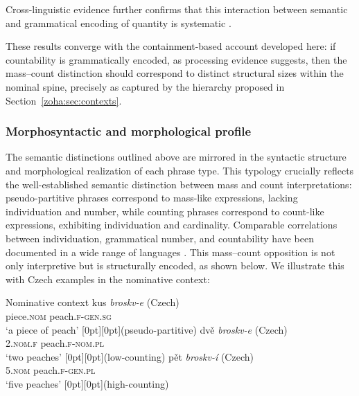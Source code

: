 \documentclass[output=paper,colorlinks,citecolor=brown
]{langscibook}
\begin{document}
Cross-linguistic evidence further confirms that this interaction between semantic and grammatical encoding of quantity is systematic 
\citep{Doetjes2017}.

These results converge with the containment-based account developed here: if countability is grammatically encoded, as processing evidence suggests, then the mass–count distinction should correspond to distinct structural sizes within the nominal spine, precisely as captured by the hierarchy proposed in Section~\ref{zoha:sec:contexts}.

\subsubsection{Morphosyntactic and morphological profile} \label{zoha:sec:types-morph}

The semantic distinctions outlined above are mirrored in the syntactic structure and morphological realization of each phrase type. This typology crucially reflects the well-established semantic distinction between mass and count interpretations: pseudo-partitive phrases correspond to mass-like expressions, lacking individuation and number, while counting phrases correspond to count-like expressions, exhibiting individuation and cardinality. Comparable correlations between individuation, grammatical number, and countability have been documented in a wide range of languages \citep{Doetjes2017}. This mass–count opposition is not only interpretive but is structurally encoded, as shown below. We illustrate this with Czech examples in the nominative context:

\ea Nominative context \label{zoha:ex:phrases}
    \ea \gll kus \textit{broskv-e} (Czech)\\
piece.\textsc{nom} peach.\textsc{f}-\textsc{gen.sg}\\
    \glt `a piece of peach' \label{zoha:ex:aabpart1} \hfill \raisebox{2.0\baselineskip}[0pt][0pt]{(pseudo-partitive)}
    \ex \gll dvě \textit{broskv-e} (Czech)\\
    2.\textsc{nom.f} peach.\textsc{f}-\textsc{nom.pl}\\
    \glt `two peaches' \label{zoha:ex:aablow1} \hfill \raisebox{2.0\baselineskip}[0pt][0pt]{(low-counting)}
    \ex \gll pět  \textit{broskv-í} (Czech)\\
    5.\textsc{nom} peach.\textsc{f}-\textsc{gen.pl}\\
    \glt `five peaches' \label{zoha:ex:aabhigh1} \hfill \raisebox{2.0\baselineskip}[0pt][0pt]{(high-counting)}
    \z
\z
\end{document}
